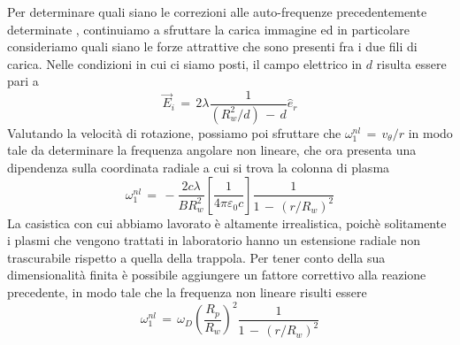 Per determinare quali siano le correzioni alle auto-frequenze precedentemente determinate , continuiamo a sfruttare la carica immagine 
ed in particolare consideriamo quali siano le forze attrattive che sono presenti fra i due fili di carica. Nelle condizioni in cui ci siamo 
posti, il campo elettrico in $d$ risulta essere pari a 
\begin{equation}
    \vec{E}_i\,=\,2\lambda\frac{1}{\left(R_w^2/d\right)\,-\,d}\hat{e}_r
    \label{equation: campo_offset}
\end{equation}
Valutando la velocità di rotazione, possiamo poi sfruttare che $\omega_1^{nl}\,=\,v_\theta/r$ in modo tale da determinare la frequenza 
angolare non lineare, che ora presenta una dipendenza sulla coordinata radiale a cui si trova la colonna di plasma
\begin{equation}
    \omega_1^{nl}\,=\,-\frac{2c\lambda}{BR_w^2}\left[\frac{1}{4\pi\varepsilon_0c}\right]\frac{1}{1\,-\,\left(r/R_w\right)^2}
    \label{equation: freqnl}
\end{equation}
La casistica con cui abbiamo lavorato è altamente irrealistica, poichè solitamente i plasmi che vengono trattati in laboratorio hanno 
un estensione radiale non trascurabile rispetto a quella della trappola. Per tener conto della sua dimensionalità finita è possibile 
aggiungere un fattore correttivo alla reazione precedente, in modo tale che la frequenza non lineare risulti essere 
\begin{equation}
    \omega_1^{nl}\,=\,\omega_D\left(\frac{R_p}{R_w}\right)^2\frac{1}{1\,-\,\left(r/R_w\right)^2}
    \label{equation: freqnl_dimFinita}
\end{equation}
